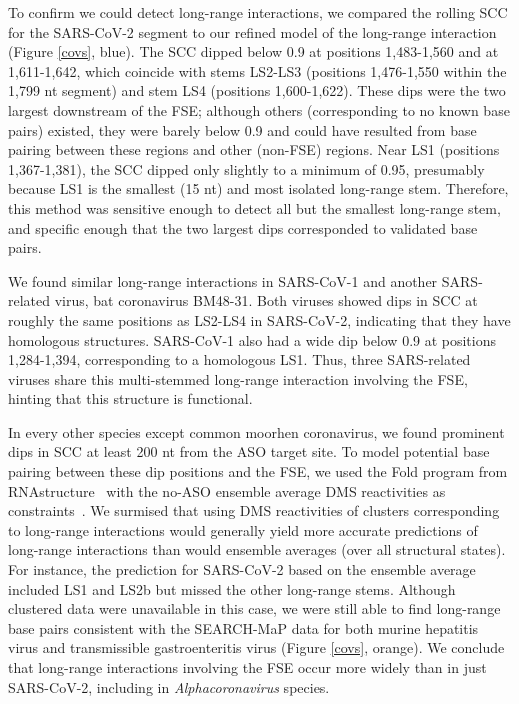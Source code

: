 \documentclass[main.tex]{subfiles}
\begin{document}
To confirm we could detect long-range interactions, we compared the rolling SCC for the SARS-CoV-2 segment to our refined model of the long-range interaction (Figure \ref{covs}, blue).
The SCC dipped below 0.9 at positions 1,483-1,560 and at 1,611-1,642, which coincide with stems LS2-LS3 (positions 1,476-1,550 within the 1,799 nt segment) and stem LS4 (positions 1,600-1,622).
These dips were the two largest downstream of the FSE; although others (corresponding to no known base pairs) existed, they were barely below 0.9 and could have resulted from base pairing between these regions and other (non-FSE) regions.
Near LS1 (positions 1,367-1,381), the SCC dipped only slightly to a minimum of 0.95, presumably because LS1 is the smallest (15 nt) and most isolated long-range stem.
Therefore, this method was sensitive enough to detect all but the smallest long-range stem, and specific enough that the two largest dips corresponded to validated base pairs.

We found similar long-range interactions in SARS-CoV-1 and another SARS-related virus, bat coronavirus BM48-31.
Both viruses showed dips in SCC at roughly the same positions as LS2-LS4 in SARS-CoV-2, indicating that they have homologous structures.
SARS-CoV-1 also had a wide dip below 0.9 at positions 1,284-1,394, corresponding to a homologous LS1.
Thus, three SARS-related viruses share this multi-stemmed long-range interaction involving the FSE, hinting that this structure is functional.

In every other species except common moorhen coronavirus, we found prominent dips in SCC at least 200 nt from the ASO target site.
To model potential base pairing between these dip positions and the FSE, we used the Fold program from RNAstructure~\cite{Mathews2004a} with the no-ASO ensemble average DMS reactivities as constraints~\cite{Cordero2012}.
We surmised that using DMS reactivities of clusters corresponding to long-range interactions would generally yield more accurate predictions of long-range interactions than would ensemble averages (over all structural states).
For instance, the prediction for SARS-CoV-2 based on the ensemble average included LS1 and LS2b but missed the other long-range stems.
Although clustered data were unavailable in this case, we were still able to find long-range base pairs consistent with the SEARCH-MaP data for both murine hepatitis virus and transmissible gastroenteritis virus (Figure \ref{covs}, orange).
We conclude that long-range interactions involving the FSE occur more widely than in just SARS-CoV-2, including in \textit{Alphacoronavirus} species.
\end{document}
